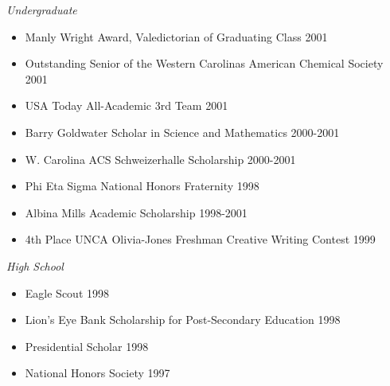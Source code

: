 {\sl Undergraduate}
\begin{itemize} \itemsep -12pt %
\item Manly Wright Award, Valedictorian of Graduating Class	\hfill 2001 \\
\item Outstanding Senior of the Western Carolinas American Chemical Society	\hfill 2001 \\
\item USA Today All-Academic 3rd Team	\hfill 2001 \\
\item Barry Goldwater Scholar in Science and Mathematics	\hfill 2000-2001 \\
\item W. Carolina ACS Schweizerhalle Scholarship	\hfill 2000-2001 \\
\item Phi Eta Sigma National Honors Fraternity	\hfill 1998 \\
\item Albina Mills Academic Scholarship	\hfill 1998-2001 \\
\item 4th Place UNCA Olivia-Jones Freshman Creative Writing Contest	\hfill 1999 \\
\end{itemize}

{\sl High School}
\begin{itemize} \itemsep -12pt %
\item Eagle Scout	\hfill 1998 \\
\item Lion's Eye Bank Scholarship for Post-Secondary Education	\hfill 1998 \\
\item Presidential Scholar	\hfill 1998 \\
\item National Honors Society	\hfill 1997 \\
\end{itemize}
